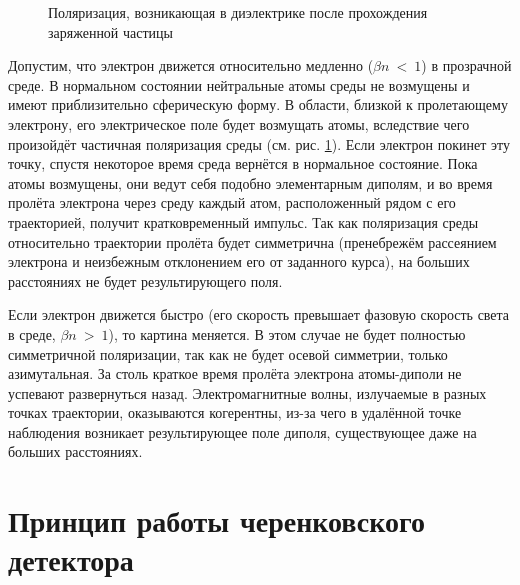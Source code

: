 \documentclass[12pt,a4paper]{report} %
\begin{document}
\begin{figure}[th]
	\noindent{}
	\caption{Поляризация, возникающая в диэлектрике после прохождения заряженной частицы}
	\label{pic:Polarisation}
\end{figure}

Допустим, что электрон движется относительно медленно ($\beta n~<~1$) в прозрачной среде. В нормальном состоянии нейтральные атомы среды не возмущены и имеют приблизительно сферическую форму. В области, близкой к пролетающему электрону, его электрическое поле будет возмущать атомы, вследствие чего произойдёт частичная поляризация среды (см. рис. \ref{pic:Polarisation}). Если электрон покинет эту точку, спустя некоторое время среда вернётся в нормальное состояние. Пока атомы возмущены, они ведут себя подобно элементарным диполям, и во время пролёта электрона через среду каждый атом, расположенный рядом с его траекторией, получит кратковременный импульс. Так как поляризация среды относительно траектории пролёта будет симметрична (пренебрежём рассеянием электрона и неизбежным отклонением его от заданного курса), на больших расстояниях не будет результирующего поля.

Если электрон движется быстро (его скорость превышает фазовую скорость света в среде, $\beta n~ >~ 1$), то картина меняется. В этом случае не будет полностью симметричной поляризации, так как не будет осевой симметрии, только азимутальная. За столь краткое время пролёта электрона атомы-диполи не успевают развернуться назад.
Электромагнитные волны, излучаемые в разных точках траектории, оказываются когерентны, из-за чего в удалённой точке наблюдения возникает результирующее поле диполя, существующее даже на больших расстояниях. 
\section{Принцип работы черенковского детектора}
\end{document}
